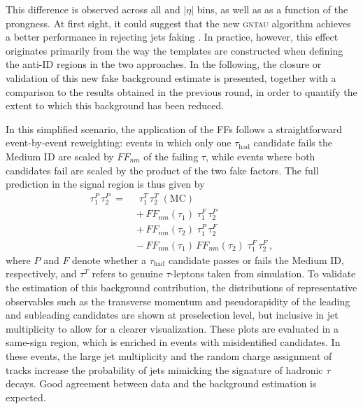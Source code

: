 This difference is observed across all \pt and $|\eta|$ bins, as well as as a function of the prongness. At first sight, it could suggest that the new \textsc{gntau} algorithm achieves a better performance in rejecting jets faking \tauhad. In practice, however, this effect originates primarily from the way the templates are constructed when defining the anti-ID regions in the two approaches. In the following, the closure or validation of this new fake background estimate is presented, together with a comparison to the results obtained in the previous round, in order to quantify the extent to which this background has been reduced.

In this simplified scenario, the application of the FFs follows a straightforward event-by-event reweighting: events in which only one $\tau_{\mathrm{had}}$ candidate fails the Medium ID are scaled by $FF_{nm}$ of the failing $\tau$, while events where both candidates fail are scaled by the product of the two fake factors. The full prediction in the signal region is thus given by
\begin{align}
    \tau_1^{P}\,\tau_2^{P} \;=\;&\;
    \tau_1^{T}\,\tau_2^{T}\;(\text{MC}) \nonumber \\[0.2cm]
    &+\, FF_{nm}(\tau_1)\;\tau_1^{F}\,\tau_2^{P} \nonumber \\[0.2cm]
    &+\, FF_{nm}(\tau_2)\;\tau_1^{P}\,\tau_2^{F} \nonumber \\[0.2cm]
    &-\, FF_{nm}(\tau_1)\,FF_{nm}(\tau_2)\;\tau_1^{F}\,\tau_2^{F}\,,
    \label{eq_fakes}
    \end{align}
where $P$ and $F$ denote whether a $\tau_{\mathrm{had}}$ candidate passes or fails the Medium ID, respectively, and $\tau^T$ refers to genuine $\tau$-leptons taken from simulation.  
To validate the estimation of this background contribution, the distributions of representative observables such as the transverse momentum and pseudorapidity of the leading and subleading \tauhad candidates are shown at preselection level, but inclusive in jet multiplicity to allow for a clearer visualization.  
These plots are evaluated in a same-sign region, which is enriched in events with misidentified \tauhad candidates. In these events, the large jet multiplicity and the random charge assignment of tracks increase the probability of jets mimicking the signature of hadronic $\tau$ decays. Good agreement between data and the background estimation is expected. 
    
